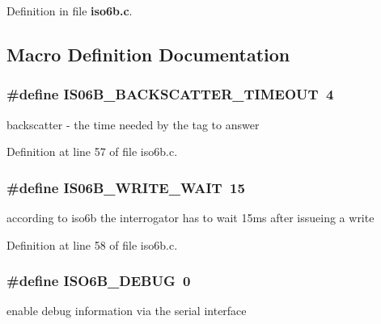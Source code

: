 Definition in file {\bf iso6b.\-c}.



\subsection{Macro Definition Documentation}
\subsubsection[{I\-S06\-B\-\_\-\-B\-A\-C\-K\-S\-C\-A\-T\-T\-E\-R\-\_\-\-T\-I\-M\-E\-O\-U\-T}]{\setlength{\rightskip}{0pt plus 5cm}\#define I\-S06\-B\-\_\-\-B\-A\-C\-K\-S\-C\-A\-T\-T\-E\-R\-\_\-\-T\-I\-M\-E\-O\-U\-T~4}\label{iso6b_8c_a53597734860419b74ff4cc00fa3098a1}
backscatter -\/ the time needed by the tag to answer 

Definition at line 57 of file iso6b.\-c.

\subsubsection[{I\-S06\-B\-\_\-\-W\-R\-I\-T\-E\-\_\-\-W\-A\-I\-T}]{\setlength{\rightskip}{0pt plus 5cm}\#define I\-S06\-B\-\_\-\-W\-R\-I\-T\-E\-\_\-\-W\-A\-I\-T~15}\label{iso6b_8c_a42bc65b7c3626d6391004295227f1d88}
according to iso6b the interrogator has to wait 15ms after issueing a write 

Definition at line 58 of file iso6b.\-c.

\subsubsection[{I\-S\-O6\-B\-\_\-\-D\-E\-B\-U\-G}]{\setlength{\rightskip}{0pt plus 5cm}\#define I\-S\-O6\-B\-\_\-\-D\-E\-B\-U\-G~0}\label{iso6b_8c_a66f9a31eaa29eecc2bd7cfe47b4503b2}
enable debug information via the serial interface 

